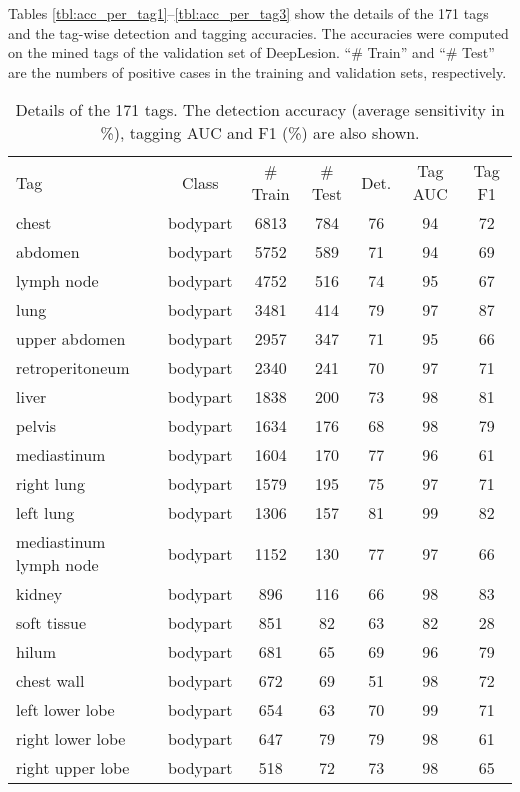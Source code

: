 \documentclass[runningheads]{llncs}
\begin{document}
Tables \ref{tbl:acc_per_tag1}--\ref{tbl:acc_per_tag3} show the details of the 171 tags and the tag-wise detection and tagging accuracies. The accuracies were computed on the mined tags \cite{Yan2019Lesa} of the validation set of DeepLesion. ``\# Train'' and ``\# Test'' are the numbers of positive cases in the training and validation sets, respectively.

\begin{table}[]
	\centering
	\scriptsize
	\setlength{\tabcolsep}{5pt}
	\renewcommand{\arraystretch}{1.2}
	\caption{Details of the 171 tags. The detection accuracy (average sensitivity in \%), tagging AUC and F1 (\%) are also shown.}
	\begin{tabular}{p{3.6cm}cccccc}
		\hline
		Tag	& Class	& \# Train	& \# Test	& Det.	& Tag AUC	& Tag F1 \\
		chest	&  bodypart	& 6813	& 784	& 76	& 94	& 72 \\
		abdomen	&  bodypart	& 5752	& 589	& 71	& 94	& 69 \\
		lymph node	&  bodypart	& 4752	& 516	& 74	& 95	& 67 \\
		lung	&  bodypart	& 3481	& 414	& 79	& 97	& 87 \\
		upper abdomen	&  bodypart	& 2957	& 347	& 71	& 95	& 66 \\
		retroperitoneum	&  bodypart	& 2340	& 241	& 70	& 97	& 71 \\
		liver	&  bodypart	& 1838	& 200	& 73	& 98	& 81 \\
		pelvis	&  bodypart	& 1634	& 176	& 68	& 98	& 79 \\
		mediastinum	&  bodypart	& 1604	& 170	& 77	& 96	& 61 \\
		right lung	&  bodypart	& 1579	& 195	& 75	& 97	& 71 \\
		left lung	&  bodypart	& 1306	& 157	& 81	& 99	& 82 \\
		mediastinum lymph node	&  bodypart	& 1152	& 130	& 77	& 97	& 66 \\
		kidney	&  bodypart	& 896	& 116	& 66	& 98	& 83 \\
		soft tissue	&  bodypart	& 851	& 82	& 63	& 82	& 28 \\
		hilum	&  bodypart	& 681	& 65	& 69	& 96	& 79 \\
		chest wall	&  bodypart	& 672	& 69	& 51	& 98	& 72 \\
		left lower lobe	&  bodypart	& 654	& 63	& 70	& 99	& 71 \\
		right lower lobe	&  bodypart	& 647	& 79	& 79	& 98	& 61 \\
		right upper lobe	&  bodypart	& 518	& 72	& 73	& 98	& 65 \\

\end{tabular}
\end{table}
\end{document}
